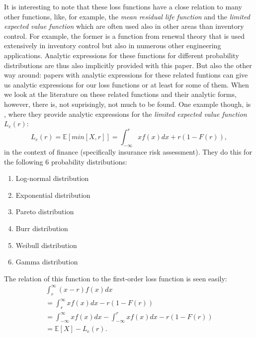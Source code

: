 \documentclass{article}
\begin{document}
\begin{flushleft}
    It is interesting to note that these loss functions have a close relation to many other functions, like, for example, the \textit{mean residual life function} and the \textit{limited expected value function} which are often used also in other areas than inventory control.
    For example, the former is a function from renewal theory that is used extensively in inventory control but also in numerous other engineering applications.
    Analytic expressions for these functions for different probability distributions are thus also implicitly provided with this paper.
    But also the other way around: papers with analytic expressions for these related funtions can give us analytic expressions for our loss functions or at least for some of them.
    When we look at the literature on these related functions and their analytic forms, however, there is, not suprisingly, not much to be found.
    One example though, is \cite{Burnecki2005}, where they provide analytic expressions for the \textit{limited expected value function} $L_e(r)$:
    \begin{equation}
        L_e(r) = \mathbb{E}[min[X, r]] = \int_{-\infty}^{r} xf(x) dx + r(1-F(r)),
    \end{equation}
    in the context of finance (specifically insurance risk assessment). They do this for the following $6$ probability distributions:
    \begin{enumerate}
        \item Log-normal distribution
        \item Exponential distribution
        \item Pareto distribution
        \item Burr distribution
        \item Weibull distribution
        \item Gamma distribution
    \end{enumerate}
    The relation of this function to the first-order loss function is seen easily:
    \begin{equation} \label{eq:35}
        \begin{gathered}
            \int_r^\infty (x-r)f(x)dx \\
            = \int_{r}^{\infty} xf(x) dx - r(1-F(r)) \\
            = \int_{-\infty}^{\infty} xf(x) dx - \int_{-\infty}^{r} xf(x) dx  - r(1-F(r)) \\
            = \mathbb{E}[X] - L_e(r).
        \end{gathered}

\end{equation}
\end{flushleft}
\end{document}
